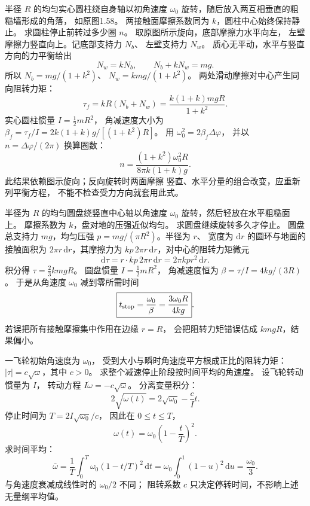 半径 $R$ 的均匀实心圆柱绕自身轴以初角速度
$\omega_0$ 旋转，随后放入两互相垂直的粗糙墙形成的角落，
如原图1.58。
两接触面摩擦系数同为 $k$，圆柱中心始终保持静止。
求圆柱停止前转过多少圈 $n$。
\exsolution
取原图所示旋向，底部摩擦力水平向左，
左壁摩擦力竖直向上。记底部支持力 $N_b$、
左壁支持力 $N_w$。
质心无平动，水平与竖直方向的力平衡给出
\[
N_w=kN_b,\qquad N_b+kN_w=mg.
\]
所以
$N_b=mg/(1+k^2)$、
$N_w=kmg/(1+k^2)$。
两处滑动摩擦对中心产生同向阻转力矩：
\[
\tau_f=kR(N_b+N_w)
=\frac{k(1+k)mgR}{1+k^2}.
\]
实心圆柱惯量 $I=\frac12mR^2$，
角减速度大小为
$\beta_f=\tau_f/I=
2k(1+k)g/[(1+k^2)R]$。
用 $\omega_0^2=2\beta_f\Delta\varphi$，
并以 $n=\Delta\varphi/(2\pi)$ 换算圈数：
\[
\boxed{n=\frac{(1+k^2)\omega_0^2R}
{8\pi k(1+k)g}}.
\]
\excheck 此结果依赖图示旋向；反向旋转时两面摩擦
竖直、水平分量的组合改变，应重新列平衡方程，
不能不检查受力方向就套用此式。

半径为 $R$ 的均匀圆盘绕竖直中心轴以角速度
$\omega_0$ 旋转，然后轻放在水平粗糙面上。
摩擦系数为 $k$，盘对地的压强近似均匀。
求圆盘继续旋转多久才停止。
\exsolution
圆盘总支持力 $mg$，均匀压强
$p=mg/(\pi R^2)$。半径为 $r$、
宽度为 $\mathrm dr$ 的圆环与地面的接触面积为
$2\pi r\,\mathrm dr$，其摩擦力为
$k p\,2\pi r\,\mathrm dr$，对中心的阻转力矩微元
\[
\mathrm d\tau=r\cdot k p\,2\pi r\,\mathrm dr
=2\pi kp r^2\,\mathrm dr.
\]
积分得 $\tau=\frac23kmgR$。
圆盘惯量 $I=\frac12mR^2$，
角减速度恒为
$\beta=\tau/I=4kg/(3R)$。
于是从角速度 $\omega_0$ 减到零所需时间
\[
\boxed{t_{\rm stop}=\frac{\omega_0}{\beta}
=\frac{3\omega_0R}{4kg}}.
\]
\excheck 若误把所有接触摩擦集中作用在边缘 $r=R$，
会把阻转力矩错误估成 $kmgR$，结果偏小。

一飞轮初始角速度为 $\omega_0$，
受到大小与瞬时角速度平方根成正比的阻转力矩：
$|\tau|=c\sqrt{\omega}$，其中 $c>0$。
求整个减速停止阶段按时间平均的角速度。
\exsolution
设飞轮转动惯量为 $I$，
转动方程
$I\dot\omega=-c\sqrt{\omega}$。
分离变量积分：
\[
2\sqrt{\omega(t)}=
2\sqrt{\omega_0}-\frac cI t.
\]
停止时间为 $T=2I\sqrt{\omega_0}/c$，
因此在 $0\le t\le T$，
\[
\omega(t)=\omega_0\left(1-\frac tT\right)^2.
\]
求时间平均：
\[
\boxed{\bar\omega=\frac1T\int_0^T
\omega_0(1-t/T)^2\,\mathrm dt
=\omega_0\int_0^1(1-u)^2\,\mathrm du
=\frac{\omega_0}{3}}.
\]
\excheck 与角速度衰减成线性时的 $\omega_0/2$ 不同；
阻转系数 $c$ 只决定停转时间，不影响上述无量纲平均值。
